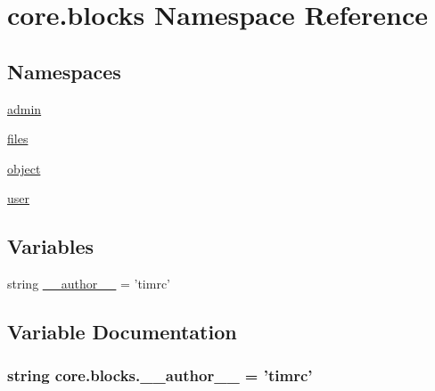 \hypertarget{namespacecore_1_1blocks}{\section{core.\-blocks Namespace Reference}
\label{namespacecore_1_1blocks}
}
\subsection*{Namespaces}
\begin{DoxyCompactItemize}
\item 
\hyperlink{namespacecore_1_1blocks_1_1admin}{admin}
\item 
\hyperlink{namespacecore_1_1blocks_1_1files}{files}
\item 
\hyperlink{namespacecore_1_1blocks_1_1object}{object}
\item 
\hyperlink{namespacecore_1_1blocks_1_1user}{user}
\end{DoxyCompactItemize}
\subsection*{Variables}
\begin{DoxyCompactItemize}
\item 
string \hyperlink{namespacecore_1_1blocks_acb90e6c6865546d6a3b69b8fb2abfae3}{\-\_\-\-\_\-author\-\_\-\-\_\-} = 'timrc'
\end{DoxyCompactItemize}


\subsection{Variable Documentation}
\hypertarget{namespacecore_1_1blocks_acb90e6c6865546d6a3b69b8fb2abfae3}{
\subsubsection[{\-\_\-\-\_\-author\-\_\-\-\_\-}]{\setlength{\rightskip}{0pt plus 5cm}string core.\-blocks.\-\_\-\-\_\-author\-\_\-\-\_\- = 'timrc'}}\label{namespacecore_1_1blocks_acb90e6c6865546d6a3b69b8fb2abfae3}

